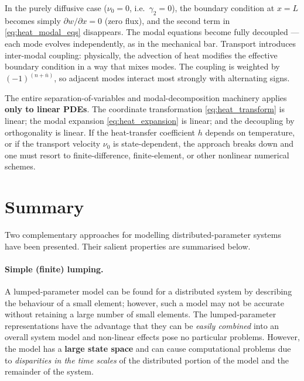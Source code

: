 \begin{insightbox}
  In the purely diffusive case ($\nu_{0} = 0$, i.e.\ $\gamma_{2}=0$), the
  boundary condition at $x=L$ becomes simply $\partial w/\partial x = 0$
  (zero flux), and the second term in \eqref{eq:heat_modal_eqs} disappears.
  The modal equations become fully decoupled --- each mode evolves
  independently, as in the mechanical bar.  Transport introduces
  inter-modal coupling: physically, the advection of heat modifies the
  effective boundary condition in a way that mixes modes.  The coupling
  is weighted by $(-1)^{(n+\bar{n})}$, so adjacent modes interact most
  strongly with alternating signs.
\end{insightbox}

\begin{warningbox}
  The entire separation-of-variables and modal-decomposition machinery
  applies \textbf{only to linear PDEs}.  The coordinate transformation
  \eqref{eq:heat_transform} is linear; the modal expansion
  \eqref{eq:heat_expansion} is linear; and the decoupling by orthogonality
  is linear.  If the heat-transfer coefficient $h$ depends on temperature,
  or if the transport velocity $\nu_{0}$ is state-dependent, the approach
  breaks down and one must resort to finite-difference, finite-element, or
  other nonlinear numerical schemes.
\end{warningbox}


\section{Summary}
\label{sec:distrib_summary}

Two complementary approaches for modelling distributed-parameter systems have
been presented.  Their salient properties are summarised below.

\paragraph{Simple (finite) lumping.}
A lumped-parameter model can be found for a distributed system by describing the
behaviour of a small element; however, such a model may not be accurate without
retaining a large number of small elements.  The lumped-parameter representations
have the advantage that they can be \emph{easily combined} into an overall system
model and non-linear effects pose no particular problems.  However, the model has
a \textbf{large state space} and can cause computational problems due to
\emph{disparities in the time scales} of the distributed portion of the model and
the remainder of the system.

